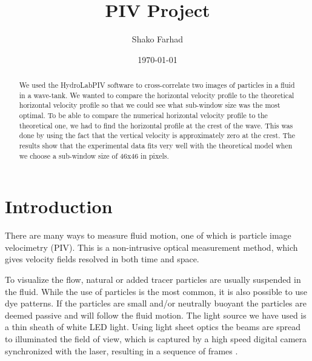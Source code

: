 \documentclass[english,a4paper,12pt]{article}
\title{PIV Project}
\author{Shako Farhad}
\date{\today}
\begin{document}
 
 
\lstset{style=mystyle}

\maketitle

\begin{abstract}
We used the HydroLabPIV software to cross-correlate two images of particles in a fluid in a wave-tank. We wanted to compare the horizontal velocity profile to the theoretical horizontal velocity profile so that we could see what sub-window size was the most optimal. To be able to compare the numerical horizontal velocity profile to the theoretical one, we had to find the horizontal profile at the crest of the wave. This was done by using the fact that the vertical velocity is approximately zero at the crest. The results show that the experimental data fits very well with the theoretical model when we choose a sub-window size of 46x46 in pixels.
\end{abstract}

\section*{Introduction}
There are many ways to measure fluid motion, one of which is particle image velocimetry (PIV). This is a
non-intrusive optical measurement method, which gives velocity fields resolved in both time and space. \\ \bigskip

To visualize the flow, natural or added tracer particles are usually suspended in the fluid. While the use of particles is the most common, it is also possible to use dye patterns. If the particles are small and/or neutrally buoyant the particles are deemed passive and will follow the fluid motion. The light source we have used is a thin sheath of white LED light. Using light sheet optics the beams are spread to illuminated the field of view, which is captured by a high speed digital camera synchronized with the laser, resulting in a sequence of frames {\cite{HLPIV}}. \\ \bigskip
\end{document}
